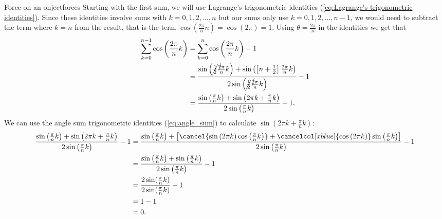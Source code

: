 \begin{example}{Force on an onject}{forces}
  Starting with the first sum, we will use Lagrange's trigonometric identities (\autoref{eq:Lagrange's trigonometric identities}). Since these identities involve sums with $k=0,1,2,\dots,n$ but our sums only use $k=0,1,2,\dots,n-1$, we would need to subtract the term where $k=n$ from the result, that is the term $\cos\left(\frac{2\pi}{n}n\right)=\cos\left(2\pi\right)=1$. Using $\theta=\frac{2\pi}{n}$ in the identities we get that
  \begin{align*}
    \sum\limits_{k=0}^{n-1}\cos\left( \frac{2\pi}{n}k \right) &= \sum\limits_{k=0}^{n}\cos\left( \frac{2\pi}{n}k \right)-1\\
                                                              &= \frac{\sin\left(\cancel{\frac{1}{2}}\frac{\cancel{2}\pi}{n}k\right)+\sin\left(\left[n+\frac{1}{2}\right]\frac{2\pi}{n}k\right)}{2\sin\left(\cancel{\frac{1}{2}}\frac{\cancel{2}\pi}{n}k\right)}-1\\
                                                              &= \frac{\sin\left(\frac{\pi}{n}k\right)+\sin\left(2\pi k+\frac{\pi}{n}k\right)}{2\sin\left(\frac{\pi}{n}k\right)}-1.
  \end{align*}
  We can use the angle sum trigonometric identities (\autoref{eq:angle_sum}) to calculate $\sin\left(2\pi k+\frac{\pi}{n}k\right)$:
  \begin{align*}
    \frac{\sin\left(\frac{\pi}{n}k\right)+\sin\left(2\pi k+\frac{\pi}{n}k\right)}{2\sin\left(\frac{\pi}{n}k\right)}-1 &= \frac{\sin\left(\frac{\pi}{n}k\right)+\left[\cancel{\sin\left(2\pi k\right)\cos\left(\frac{\pi}{n}k\right)}+\cancelcol[xblue]{\cos\left(2\pi k\right)}\sin\left(\frac{\pi}{n}k\right)\right]}{2\sin\left(\frac{\pi}{n}k\right)}-1\\
                                                                                                                      &= \frac{\sin\left(\frac{\pi}{n}k\right)+\sin\left(\frac{\pi}{n}k\right)}{2\sin\left(\frac{\pi}{n}k\right)}-1\\ 
                                                                                                                      &= \frac{2\sin(\frac{\pi}{n}k)}{2\sin(\frac{\pi}{n}k)} - 1\\
                                                                                                                      &= 1-1\\
                                                                                                                      &= 0.
  \end{align*}


\end{example}

